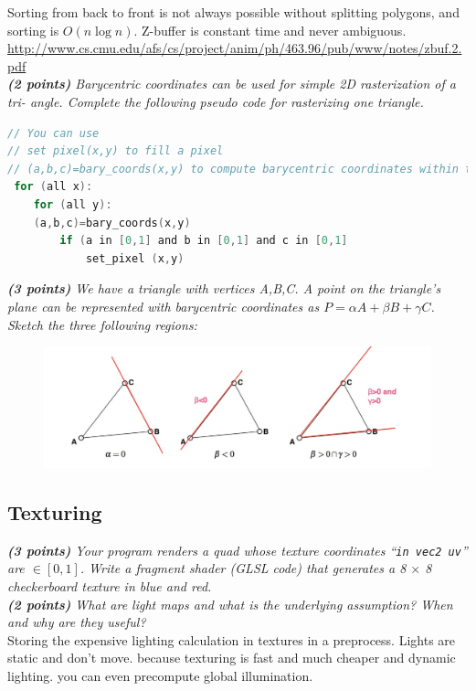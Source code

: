 \documentclass[a4paper,10pt]{article}
\begin{document}
Sorting from back to front is not always possible without splitting polygons, and sorting is  $O(n \log n)$. Z-buffer is constant time and never ambiguous.\\

\url{http://www.cs.cmu.edu/afs/cs/project/anim/ph/463.96/pub/www/notes/zbuf.2.pdf}\\

\textit{\textbf{(2 points)} Barycentric coordinates can be used for simple 2D rasterization of a tri-
angle. Complete the following pseudo code for rasterizing one triangle.}\\
\begin{lstlisting}[language=C]
// You can use
// set pixel(x,y) to fill a pixel
// (a,b,c)=bary_coords(x,y) to compute barycentric coordinates within the triangle
 for (all x): 
 	for (all y):
 	(a,b,c)=bary_coords(x,y)
		if (a in [0,1] and b in [0,1] and c in [0,1]
			set_pixel (x,y)
\end{lstlisting}

\textit{\textbf{(3 points)} We have a triangle with vertices A,B,C. A point on the triangle’s plane can be represented with barycentric coordinates as $P = \alpha A + \beta B + \gamma C$. Sketch the three following regions:}
\begin{figure}[H]
	\centering
	\includegraphics[width=.7\textwidth]{3-textures}
\end{figure}
\subsection{Texturing}
\textit{\textbf{(3 points)} Your program renders a quad whose texture coordinates ``\lstinline|in vec2 uv|'' are $\in [0, 1]$. Write a fragment shader (GLSL code) that generates a 8 $\times$ 8 checkerboard texture in blue and red.}\\

\textit{\textbf{(2 points)} What are light maps and what is the underlying assumption? When and why are they useful?}\\

Storing the expensive lighting calculation in textures in a preprocess. Lights are static and don’t move. because texturing is fast and much cheaper and dynamic lighting. you can even precompute global illumination.\\
\end{document}
